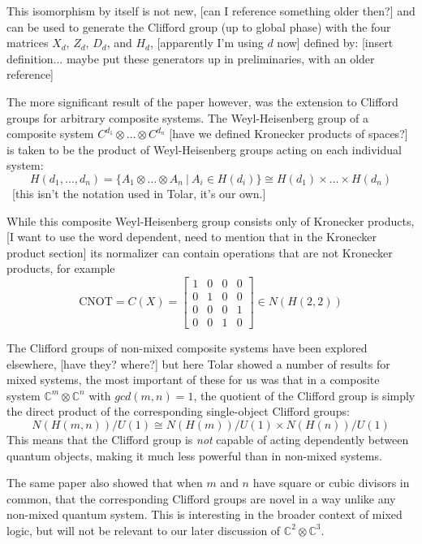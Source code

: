 This isomorphism by itself is not new, [can I reference something older then?] and can be used to generate the Clifford group (up to global phase) with the four matrices $X_d$, $Z_d$, $D_d$, and $H_d$, [apparently I'm using $d$ now] defined by:
[insert definition... maybe put these generators up in preliminaries, with an older reference]

The more significant result of the paper however, was the extension to Clifford groups for arbitrary composite systems. The Weyl-Heisenberg group of a composite system $C^{d_1}\otimes \dots \otimes C^{d_n}$ [have we defined Kronecker products of spaces?] is taken to be the product of Weyl-Heisenberg groups acting on each individual system:
\[H(d_1, \dots, d_n) = \{A_1 \otimes \dots \otimes A_n\ |\ A_i \in H(d_i)\} \cong H(d_1) \times \dots \times H(d_n)\]
\ [this isn't the notation used in Tolar, it's our own.]

While this composite Weyl-Heisenberg group consists only of Kronecker products, [I want to use the word dependent, need to mention that in the Kronecker product section] its normalizer can contain operations that are not Kronecker products, for example
\[\text{CNOT} = C(X) = \left[\begin{matrix}
	1 & 0 & 0 & 0 \\
	0 & 1 & 0 & 0 \\
	0 & 0 & 0 & 1 \\
	0 & 0 & 1 & 0
\end{matrix}\right] \in N(H(2, 2))\]

The Clifford groups of non-mixed composite systems have been explored elsewhere, [have they? where?] but here Tolar showed a number of results for mixed systems, the most important of these for us was that in a composite system $\mathbb{C}^m \otimes \mathbb{C}^n$ with $gcd(m, n) = 1$, the quotient of the Clifford group is simply the direct product of the corresponding single-object Clifford groups:
\[N(H(m, n))/U(1) \cong N(H(m))/U(1) \times N(H(n))/U(1) \]
This means that the Clifford group is \emph{not} capable of acting dependently between quantum objects, making it much less powerful than in non-mixed systems.

The same paper also showed that when $m$ and $n$ have square or cubic divisors in common, that the corresponding Clifford groups are novel in a way unlike any non-mixed quantum system. This is interesting in the broader context of mixed logic, but will not be relevant to our later discussion of $\mathbb{C}^2 \otimes \mathbb{C}^3$.

